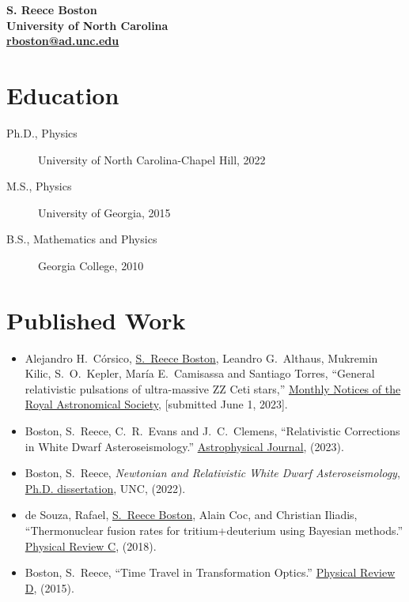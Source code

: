 \documentclass[11pt]{article}
\begin{document}
\begin{center}
{\bf \large S. Reece Boston}\\
{\bf University of North Carolina}\\
{\bf \href{mailto:rboston@ad.unc.edu}{rboston@ad.unc.edu}}
\end{center}

\section*{Education}
\begin{minipage}{\textwidth}
	\begin{description}
		\item[Ph.D., Physics] University of North Carolina-Chapel Hill, 2022
		\item[M.S., Physics] University of Georgia, 2015%
		\item[B.S., Mathematics and Physics] Georgia College, 2010%
	\end{description}
\end{minipage}

\section*{Published Work}
%
\begin{itemize}
		\item Alejandro H.~C\'orsico, \underline{S.~Reece Boston}, Leandro G.~Althaus, Mukremin Kilic,
S.~O.~Kepler, Mar\'ia E.~Camisassa and Santiago Torres, ``General relativistic pulsations of ultra-massive ZZ Ceti stars,'' \href{}{Monthly Notices of the Royal Astronomical Society}, [submitted June 1, 2023].
		\item Boston, S.~Reece, C.~R.~Evans and J.~C.~Clemens, ``Relativistic Corrections in White Dwarf Asteroseismology.'' \href{https://iopscience.iop.org/article/10.3847/1538-4357/acd446}{Astrophysical Journal}, (2023).
		\item Boston, S.~Reece, \emph{Newtonian and Relativistic White Dwarf Asteroseismology}, \href{https://cdr.lib.unc.edu/concern/dissertations/jw827n44n?locale=en}{Ph.D. dissertation}, UNC, (2022).
		\item de Souza, Rafael, \underline{S.~Reece Boston}, Alain Coc, and Christian Iliadis, ``Thermonuclear fusion rates for tritium+deuterium using Bayesian methods.''  \href{http://journals.aps.org/prc/abstract/10.1103/PhysRevC.99.014619}{Physical Review C}, (2018).
		\item Boston, S.~Reece, ``Time Travel in Transformation Optics.''  \href{http://journals.aps.org/prd/abstract/10.1103/PhysRevD.91.124035}{Physical Review D}, (2015).
\end{itemize}
\end{document}
